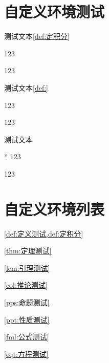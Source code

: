\thecntboxdef

\theboxdefinition

\section{自定义环境测试}
测试文本\ref{def:定积分}
\begin{BoxDefinition}[定积分]
    123    

    123
\end{BoxDefinition}

测试文本\ref{def:}
\begin{BoxDefinition}
    123    

    123
\end{BoxDefinition}

测试文本
\begin{BoxDefinition}*
    123    

    123
\end{BoxDefinition}

\section{自定义环境列表}
\begin{BoxDefinition}[定义测试]
    \cref{def:定义测试,def:定积分}
\end{BoxDefinition}

\begin{BoxTheorem}[定理测试]
    \cref{thm:定理测试}
\end{BoxTheorem}

\begin{BoxLemma}[引理测试]
    \cref{lem:引理测试}
\end{BoxLemma}

\begin{BoxCorollary}[推论测试]
    \cref{col:推论测试}
\end{BoxCorollary}

\begin{BoxProposition}[命题测试]
    \cref{pps:命题测试}
\end{BoxProposition}

\begin{BoxProperty}[性质测试]
    \cref{ppt:性质测试}
\end{BoxProperty}

\begin{BoxFormula}[公式测试]
    \cref{fml:公式测试}
\end{BoxFormula}

\begin{BoxEquation}[方程测试]
    \cref{eqt:方程测试}
\end{BoxEquation}

